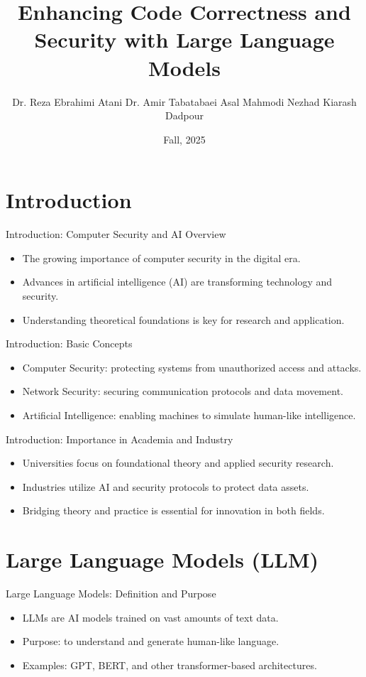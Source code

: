 \documentclass[t,ignorenonframetext]{beamer}
\title[Security & AI Overview]{Enhancing Code Correctness and Security with Large Language Models}
\author[University of Guilan]{Dr. Reza Ebrahimi Atani \newline Dr. Amir Tabatabaei \newline Asal Mahmodi Nezhad \newline Kiarash Dadpour}
\date{Fall, 2025}
\begin{document}
\frame{\maketitle}

\section{Introduction}
\begin{frame}{Introduction: Computer Security and AI Overview}
\begin{itemize}
\item The growing importance of computer security in the digital era.
\item Advances in artificial intelligence (AI) are transforming technology and security.
\item Understanding theoretical foundations is key for research and application.
\end{itemize}
\end{frame}

\begin{frame}{Introduction: Basic Concepts}
\begin{itemize}
\item Computer Security: protecting systems from unauthorized access and attacks.
\item Network Security: securing communication protocols and data movement.
\item Artificial Intelligence: enabling machines to simulate human-like intelligence.
\end{itemize}
\end{frame}

\begin{frame}{Introduction: Importance in Academia and Industry}
\begin{itemize}
\item Universities focus on foundational theory and applied security research.
\item Industries utilize AI and security protocols to protect data assets.
\item Bridging theory and practice is essential for innovation in both fields.
\end{itemize}
\end{frame}

\section{Large Language Models (LLM)}
\begin{frame}{Large Language Models: Definition and Purpose}
\begin{itemize}
\item LLMs are AI models trained on vast amounts of text data.
\item Purpose: to understand and generate human-like language.
\item Examples: GPT, BERT, and other transformer-based architectures.
\end{itemize}
\end{frame}
\end{document}
